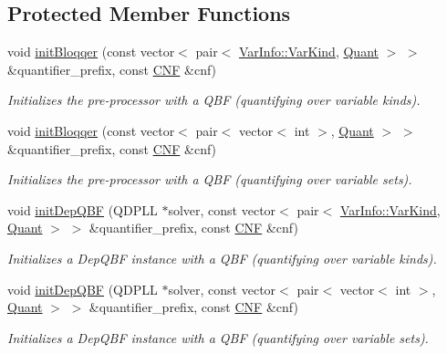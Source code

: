 \subsection*{Protected Member Functions}
\begin{DoxyCompactItemize}
\item 
void \hyperlink{classDepQBFApiInc_a91a61cebcf4b1518599129f963eab273}{init\-Bloqqer} (const vector$<$ pair$<$ \hyperlink{classVarInfo_a64d1da76cf84fe674e5fef9764ef11cf}{Var\-Info\-::\-Var\-Kind}, \hyperlink{classQBFSolver_ac091e263cb55286cc07b2451bcf4d3c7}{Quant} $>$ $>$ \&quantifier\-\_\-prefix, const \hyperlink{classCNF}{C\-N\-F} \&cnf)
\begin{DoxyCompactList}\small\item\em Initializes the pre-\/processor with a Q\-B\-F (quantifying over variable kinds). \end{DoxyCompactList}\item 
void \hyperlink{classDepQBFApiInc_a51de5d859a17257f1ca23f5ea8561223}{init\-Bloqqer} (const vector$<$ pair$<$ vector$<$ int $>$, \hyperlink{classQBFSolver_ac091e263cb55286cc07b2451bcf4d3c7}{Quant} $>$ $>$ \&quantifier\-\_\-prefix, const \hyperlink{classCNF}{C\-N\-F} \&cnf)
\begin{DoxyCompactList}\small\item\em Initializes the pre-\/processor with a Q\-B\-F (quantifying over variable sets). \end{DoxyCompactList}\item 
void \hyperlink{classDepQBFApiInc_a6cfb19ba94dfeb3058542381cf6165b9}{init\-Dep\-Q\-B\-F} (Q\-D\-P\-L\-L $\ast$solver, const vector$<$ pair$<$ \hyperlink{classVarInfo_a64d1da76cf84fe674e5fef9764ef11cf}{Var\-Info\-::\-Var\-Kind}, \hyperlink{classQBFSolver_ac091e263cb55286cc07b2451bcf4d3c7}{Quant} $>$ $>$ \&quantifier\-\_\-prefix, const \hyperlink{classCNF}{C\-N\-F} \&cnf)
\begin{DoxyCompactList}\small\item\em Initializes a Dep\-Q\-B\-F instance with a Q\-B\-F (quantifying over variable kinds). \end{DoxyCompactList}\item 
void \hyperlink{classDepQBFApiInc_adf3a9ce984ae61132ef1d493eeafcae8}{init\-Dep\-Q\-B\-F} (Q\-D\-P\-L\-L $\ast$solver, const vector$<$ pair$<$ vector$<$ int $>$, \hyperlink{classQBFSolver_ac091e263cb55286cc07b2451bcf4d3c7}{Quant} $>$ $>$ \&quantifier\-\_\-prefix, const \hyperlink{classCNF}{C\-N\-F} \&cnf)
\begin{DoxyCompactList}\small\item\em Initializes a Dep\-Q\-B\-F instance with a Q\-B\-F (quantifying over variable sets). \end{DoxyCompactList}\item 

\end{DoxyCompactItemize}
